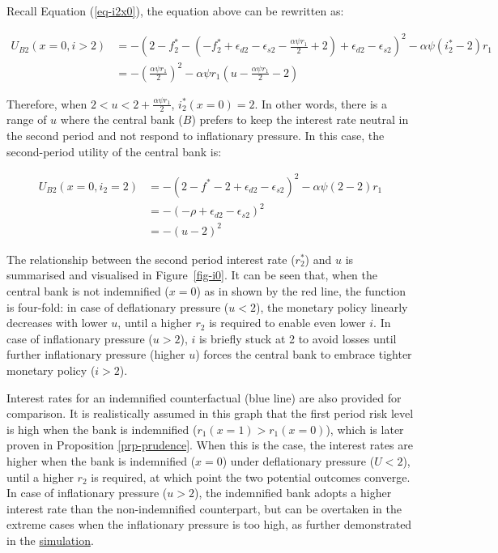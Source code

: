 \documentclass[
  a4paper,
  abstract=true]{scrartcl}
\theoremstyle{definition}
\begin{document}
Recall Equation (\ref{eq-i2x0}), the equation above can be rewritten as:

\begin{align*}
U_{B2}(x=0,i>2)&=-(2-f_2^*-(-f^*_2+\epsilon_{d2}-\epsilon_{s2}-\frac{\alpha\psi r_1}{2}+2)+\epsilon_{d2}-\epsilon_{s2})^2-\alpha\psi(i_2^*-2)r_1 \\
&=-(\frac{\alpha\psi r_1}{2})^2-\alpha\psi r_1(u-\frac{\alpha\psi r_1}{2}-2)
\end{align*}

Therefore, when \(2<u<2+\frac{\alpha\psi r_1}{2}\), \(i_2^*(x=0)=2\). In
other words, there is a range of \(u\) where the central bank (\(B\))
prefers to keep the interest rate neutral in the second period and not
respond to inflationary pressure. In this case, the second-period
utility of the central bank is:

\begin{align*}
U_{B2}(x=0,i_2=2)&=-(2-f^*-2+\epsilon_{d2}-\epsilon_{s2})^2-\alpha\psi(2-2)r_1 \\
&=-(-\rho+\epsilon_{d2}-\epsilon_{s2})^2 \\
&=-(u-2)^2
\end{align*}

The relationship between the second period interest rate (\(r_2^*\)) and
\(u\) is summarised and visualised in Figure~\ref{fig-i0}. It can be
seen that, when the central bank is not indemnified (\(x=0\)) as in
shown by the red line, the function is four-fold: in case of
deflationary pressure (\(u<2\)), the monetary policy linearly decreases
with lower \(u\), until a higher \(r_2\) is required to enable even
lower \(i\). In case of inflationary pressure (\(u>2\)), \(i\) is
briefly stuck at 2 to avoid losses until further inflationary pressure
(higher \(u\)) forces the central bank to embrace tighter monetary
policy (\(i>2\)).

Interest rates for an indemnified counterfactual (blue line) are also
provided for comparison. It is realistically assumed in this graph that
the first period risk level is high when the bank is indemnified
(\(r_1(x=1)>r_1(x=0)\)), which is later proven in Proposition
\ref{prp-prudence}. When this is the case, the interest rates are higher
when the bank is indemnified (\(x=0\)) under deflationary pressure
(\(U<2\)), until a higher \(r_2\) is required, at which point the two
potential outcomes converge. In case of inflationary pressure (\(u>2\)),
the indemnified bank adopts a higher interest rate than the
non-indemnified counterpart, but can be overtaken in the extreme cases
when the inflationary pressure is too high, as further demonstrated in
the \hyperref[sec-simulation]{simulation}.
\end{document}
